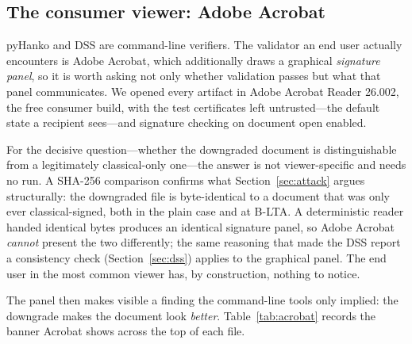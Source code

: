 
\subsection{The consumer viewer: Adobe Acrobat}
\label{sec:acrobat}

pyHanko and DSS are command-line verifiers. The validator an end user actually
encounters is Adobe Acrobat, which additionally draws a graphical \emph{signature
panel}, so it is worth asking not only whether validation passes but what that
panel communicates. We opened every artifact in Adobe Acrobat Reader 26.002, the
free consumer build, with the test certificates left untrusted---the default
state a recipient sees---and signature checking on document open enabled.

For the decisive question---whether the downgraded document is distinguishable
from a legitimately classical-only one---the answer is not viewer-specific and
needs no run. A SHA-256 comparison confirms what Section~\ref{sec:attack} argues
structurally: the downgraded file is byte-identical to a document that was only
ever classical-signed, both in the plain case and at B-LTA. A deterministic
reader handed identical bytes produces an identical signature panel, so Adobe
Acrobat \emph{cannot} present the two differently; the same reasoning that made
the DSS report a consistency check (Section~\ref{sec:dss}) applies to the
graphical panel. The end user in the most common viewer has, by construction,
nothing to notice.

The panel then makes visible a finding the command-line tools only implied: the
downgrade makes the document look \emph{better}. Table~\ref{tab:acrobat} records
the banner Acrobat shows across the top of each file.

